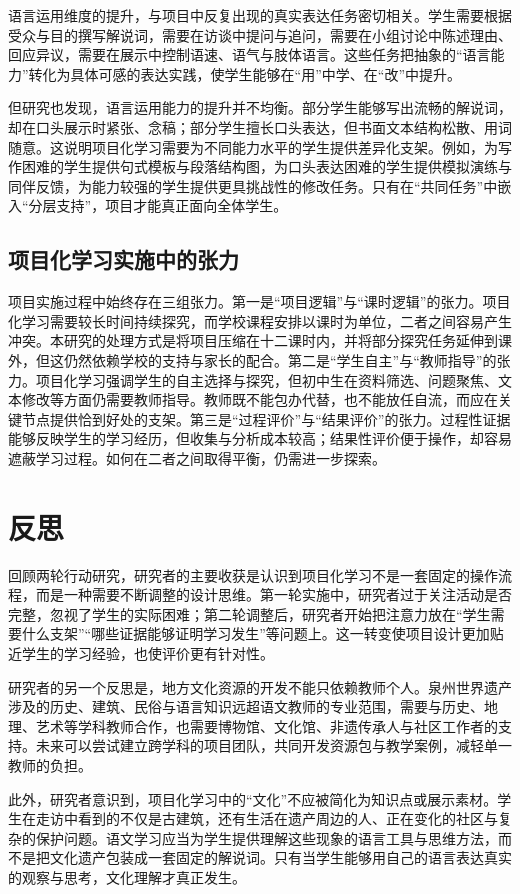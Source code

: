 语言运用维度的提升，与项目中反复出现的真实表达任务密切相关。学生需要根据受众与目的撰写解说词，需要在访谈中提问与追问，需要在小组讨论中陈述理由、回应异议，需要在展示中控制语速、语气与肢体语言。这些任务把抽象的“语言能力”转化为具体可感的表达实践，使学生能够在“用”中学、在“改”中提升。

但研究也发现，语言运用能力的提升并不均衡。部分学生能够写出流畅的解说词，却在口头展示时紧张、念稿；部分学生擅长口头表达，但书面文本结构松散、用词随意。这说明项目化学习需要为不同能力水平的学生提供差异化支架。例如，为写作困难的学生提供句式模板与段落结构图，为口头表达困难的学生提供模拟演练与同伴反馈，为能力较强的学生提供更具挑战性的修改任务。只有在“共同任务”中嵌入“分层支持”，项目才能真正面向全体学生。

\subsection{项目化学习实施中的张力}

项目实施过程中始终存在三组张力。第一是“项目逻辑”与“课时逻辑”的张力。项目化学习需要较长时间持续探究，而学校课程安排以课时为单位，二者之间容易产生冲突。本研究的处理方式是将项目压缩在十二课时内，并将部分探究任务延伸到课外，但这仍然依赖学校的支持与家长的配合。第二是“学生自主”与“教师指导”的张力。项目化学习强调学生的自主选择与探究，但初中生在资料筛选、问题聚焦、文本修改等方面仍需要教师指导。教师既不能包办代替，也不能放任自流，而应在关键节点提供恰到好处的支架。第三是“过程评价”与“结果评价”的张力。过程性证据能够反映学生的学习经历，但收集与分析成本较高；结果性评价便于操作，却容易遮蔽学习过程。如何在二者之间取得平衡，仍需进一步探索。

\section{反思}

回顾两轮行动研究，研究者的主要收获是认识到项目化学习不是一套固定的操作流程，而是一种需要不断调整的设计思维。第一轮实施中，研究者过于关注活动是否完整，忽视了学生的实际困难；第二轮调整后，研究者开始把注意力放在“学生需要什么支架”“哪些证据能够证明学习发生”等问题上。这一转变使项目设计更加贴近学生的学习经验，也使评价更有针对性。

研究者的另一个反思是，地方文化资源的开发不能只依赖教师个人。泉州世界遗产涉及的历史、建筑、民俗与语言知识远超语文教师的专业范围，需要与历史、地理、艺术等学科教师合作，也需要博物馆、文化馆、非遗传承人与社区工作者的支持。未来可以尝试建立跨学科的项目团队，共同开发资源包与教学案例，减轻单一教师的负担。

此外，研究者意识到，项目化学习中的“文化”不应被简化为知识点或展示素材。学生在走访中看到的不仅是古建筑，还有生活在遗产周边的人、正在变化的社区与复杂的保护问题。语文学习应当为学生提供理解这些现象的语言工具与思维方法，而不是把文化遗产包装成一套固定的解说词。只有当学生能够用自己的语言表达真实的观察与思考，文化理解才真正发生。
